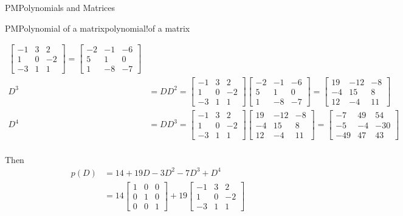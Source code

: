 \begin{subsect}{PM}{Polynomials and Matrices}
\begin{example}{PM}{Polynomial of a matrix}{polynomial!of a matrix}
\begin{para}
\begin{align*}
\begin{bmatrix}-1 & 3 & 2\\1 & 0 & -2\\-3 & 1 & 1\end{bmatrix}
=
\begin{bmatrix}-2 & -1 & -6\\5 & 1 & 0\\1 & -8 & -7\end{bmatrix}\\
%
D^3&=DD^2=
\begin{bmatrix}-1 & 3 & 2\\1 & 0 & -2\\-3 & 1 & 1\end{bmatrix}
\begin{bmatrix}-2 & -1 & -6\\5 & 1 & 0\\1 & -8 & -7\end{bmatrix}
=
\begin{bmatrix}19 & -12 & -8\\-4 & 15 & 8\\12 & -4 & 11\end{bmatrix}\\
%
D^4&=DD^3=
\begin{bmatrix}-1 & 3 & 2\\1 & 0 & -2\\-3 & 1 & 1\end{bmatrix}
\begin{bmatrix}19 & -12 & -8\\-4 & 15 & 8\\12 & -4 & 11\end{bmatrix}
=
\begin{bmatrix}-7 & 49 & 54\\-5 & -4 & -30\\-49 & 47 & 43\end{bmatrix}\\
%
\end{align*}
\end{para}
%
\begin{para}Then
%
\begin{align*}
p(D)&=14+19D-3D^2-7D^3+D^4\\
&=
  14\begin{bmatrix}1 & 0 & 0\\0 & 1 & 0\\0 & 0 & 1\end{bmatrix}
+19\begin{bmatrix}-1 & 3 & 2\\1 & 0 & -2\\-3 & 1 & 1\end{bmatrix}

\end{align*}
\end{para}
\end{example}
\end{subsect}
